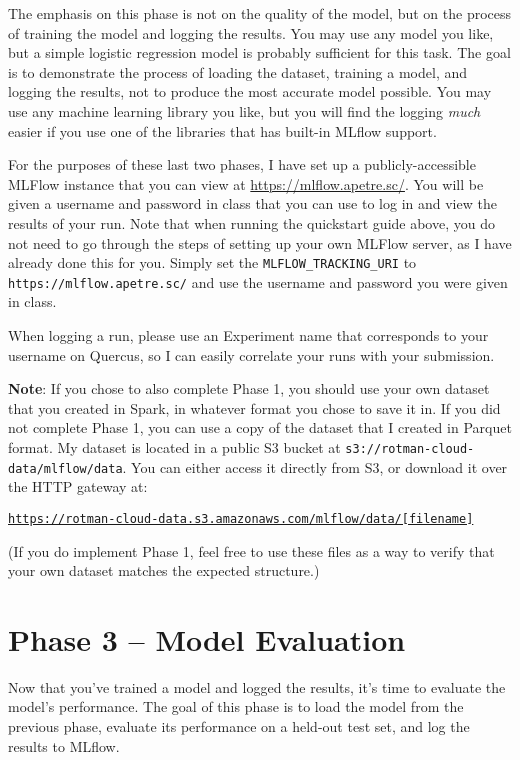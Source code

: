 \documentclass{article}
\begin{document}
The emphasis on this phase is not on the quality of the model, but on the process of training
the model and logging the results. You may use any model you like, but a simple logistic
regression model is probably sufficient for this task. The goal is to demonstrate the process
of loading the dataset, training a model, and logging the results, not to produce the most accurate model possible. You may use any machine learning library you like, but you will find
the logging \textit{much} easier if you use one of the libraries that has built-in MLflow support.

For the purposes of these last two phases, I have set up a publicly-accessible MLFlow instance
that you can view at \href{https://mlflow.apetre.sc/}{https://mlflow.apetre.sc/}. You will be given
a username and password in class that you can use to log in and view the results of your run. Note
that when running the quickstart guide above, you do not need to go through the steps of setting
up your own MLFlow server, as I have already done this for you. Simply set the \texttt{MLFLOW\_TRACKING\_URI} to \texttt{https://mlflow.apetre.sc/} and use the username and password you were given in class.

When logging a run, please use an Experiment name that corresponds to your username on Quercus, so
I can easily correlate your runs with your submission. 

\textbf{Note}: If you chose to also complete Phase 1, you should use your own dataset that you
created in Spark, in whatever format you chose to save it in. If you did not complete Phase 1,
you can use a copy of the dataset that I created in Parquet format. My dataset is located in a
public S3 bucket at \texttt{s3://rotman-cloud-data/mlflow/data}. You can either access it directly
from S3, or download it over the HTTP gateway at:

    \texttt{\href{https://rotman-cloud-data.s3.amazonaws.com/mlflow/data/}{https://rotman-cloud-data.s3.amazonaws.com/mlflow/data/[filename]}}

(If you do implement Phase 1, feel free to use these files as a way to verify that your own dataset matches the expected structure.)

\section*{Phase 3 – Model Evaluation}

Now that you've trained a model and logged the results, it's time to evaluate the model's
performance. The goal of this phase is to load the model from the previous phase, evaluate
its performance on a held-out test set, and log the results to MLflow.
\end{document}
